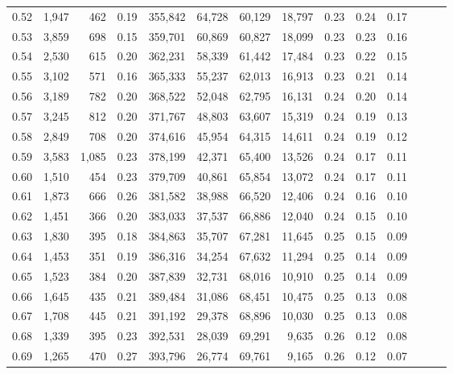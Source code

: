 \begin{tabular}{rrrrrrrrrrrrrr}
0.52 &   1,947 &    462 &  0.19 &  355,842 &   64,728 &  60,129 &  18,797 &  0.23 &  0.24 &      0.17 \\
0.53 &   3,859 &    698 &  0.15 &  359,701 &   60,869 &  60,827 &  18,099 &  0.23 &  0.23 &      0.16 \\
0.54 &   2,530 &    615 &  0.20 &  362,231 &   58,339 &  61,442 &  17,484 &  0.23 &  0.22 &      0.15 \\
0.55 &   3,102 &    571 &  0.16 &  365,333 &   55,237 &  62,013 &  16,913 &  0.23 &  0.21 &      0.14 \\
0.56 &   3,189 &    782 &  0.20 &  368,522 &   52,048 &  62,795 &  16,131 &  0.24 &  0.20 &      0.14 \\
0.57 &   3,245 &    812 &  0.20 &  371,767 &   48,803 &  63,607 &  15,319 &  0.24 &  0.19 &      0.13 \\
0.58 &   2,849 &    708 &  0.20 &  374,616 &   45,954 &  64,315 &  14,611 &  0.24 &  0.19 &      0.12 \\
0.59 &   3,583 &  1,085 &  0.23 &  378,199 &   42,371 &  65,400 &  13,526 &  0.24 &  0.17 &      0.11 \\
0.60 &   1,510 &    454 &  0.23 &  379,709 &   40,861 &  65,854 &  13,072 &  0.24 &  0.17 &      0.11 \\
0.61 &   1,873 &    666 &  0.26 &  381,582 &   38,988 &  66,520 &  12,406 &  0.24 &  0.16 &      0.10 \\
0.62 &   1,451 &    366 &  0.20 &  383,033 &   37,537 &  66,886 &  12,040 &  0.24 &  0.15 &      0.10 \\
0.63 &   1,830 &    395 &  0.18 &  384,863 &   35,707 &  67,281 &  11,645 &  0.25 &  0.15 &      0.09 \\
0.64 &   1,453 &    351 &  0.19 &  386,316 &   34,254 &  67,632 &  11,294 &  0.25 &  0.14 &      0.09 \\
0.65 &   1,523 &    384 &  0.20 &  387,839 &   32,731 &  68,016 &  10,910 &  0.25 &  0.14 &      0.09 \\
0.66 &   1,645 &    435 &  0.21 &  389,484 &   31,086 &  68,451 &  10,475 &  0.25 &  0.13 &      0.08 \\
0.67 &   1,708 &    445 &  0.21 &  391,192 &   29,378 &  68,896 &  10,030 &  0.25 &  0.13 &      0.08 \\
0.68 &   1,339 &    395 &  0.23 &  392,531 &   28,039 &  69,291 &   9,635 &  0.26 &  0.12 &      0.08 \\
0.69 &   1,265 &    470 &  0.27 &  393,796 &   26,774 &  69,761 &   9,165 &  0.26 &  0.12 &      0.07 \\

\end{tabular}
